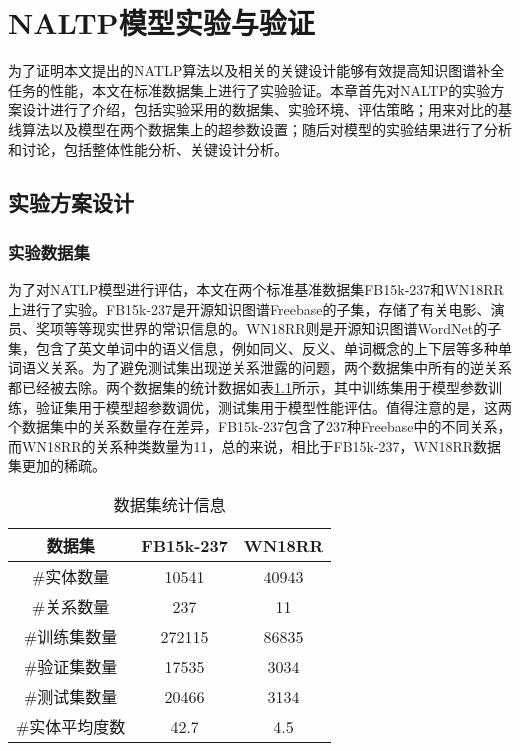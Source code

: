 \chapter{NALTP模型实验与验证}

为了证明本文提出的NATLP算法以及相关的关键设计能够有效提高知识图谱补全任务的性能，本文在标准数据集上进行了实验验证。本章首先对NALTP的实验方案设计进行了介绍，包括实验采用的数据集、实验环境、评估策略；用来对比的基线算法以及模型在两个数据集上的超参数设置；随后对模型的实验结果进行了分析和讨论，包括整体性能分析、关键设计分析。

\section{实验方案设计}

\subsection{实验数据集}
为了对NATLP模型进行评估，本文在两个标准基准数据集FB15k-237和WN18RR上进行了实验。FB15k-237是开源知识图谱Freebase的子集，存储了有关电影、演员、奖项等等现实世界的常识信息的。WN18RR则是开源知识图谱WordNet的子集，包含了英文单词中的语义信息，例如同义、反义、单词概念的上下层等多种单词语义关系。为了避免测试集出现逆关系泄露的问题，两个数据集中所有的逆关系都已经被去除。两个数据集的统计数据如表\ref{dataset_statistics}所示，其中训练集用于模型参数训练，验证集用于模型超参数调优，测试集用于模型性能评估。值得注意的是，这两个数据集中的关系数量存在差异，FB15k-237包含了237种Freebase中的不同关系，而WN18RR的关系种类数量为11，总的来说，相比于FB15k-237，WN18RR数据集更加的稀疏。

\begin{table}[htbp]
  \renewcommand\arraystretch{1.5}
  \caption{数据集统计信息}
  \centering
  \begin{tabular}{*{3}{c}}
    \toprule
    数据集 & FB15k-237 & WN18RR\\
    \midrule
    \#实体数量  & 10541 & 40943 \\
    \#关系数量 & 237 & 11\\
    \#训练集数量 & 272115 &86835\\
    \#验证集数量 &17535 &3034\\
    \#测试集数量 &20466 &3134\\
    \#实体平均度数 &42.7 &4.5\\
    \bottomrule
  \end{tabular}
  \label{dataset_statistics}
\end{table}

